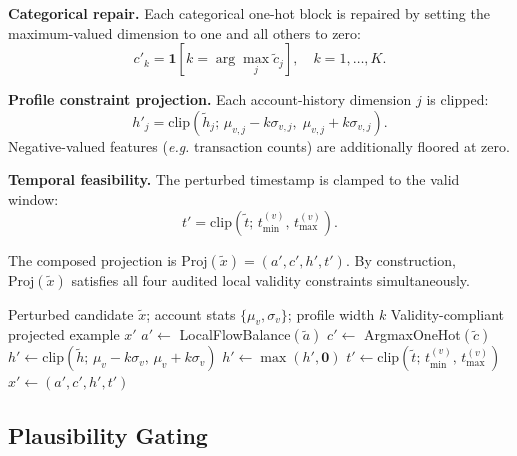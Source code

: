 \documentclass[sigconf,review,anonymous]{acmart}
\newcommand{\eg}{\textit{e.g.}\xspace}
\begin{document}
\textbf{Categorical repair.}
Each categorical one-hot block is repaired by setting the maximum-valued
dimension to one and all others to zero:
\begin{equation}
  c'_k = \mathbf{1}[k = \arg\max_j \tilde{c}_j], \quad k = 1, \ldots, K.
  \label{eq:cat}
\end{equation}

\textbf{Profile constraint projection.}
Each account-history dimension $j$ is clipped:
\begin{equation}
  h'_j = \mathrm{clip}\!\left(\tilde{h}_j;\,
    \mu_{v,j} - k\sigma_{v,j},\; \mu_{v,j} + k\sigma_{v,j}\right).
  \label{eq:profile}
\end{equation}
Negative-valued features (\eg transaction counts) are additionally floored
at zero.

\textbf{Temporal feasibility.}
The perturbed timestamp is clamped to the valid window:
\begin{equation}
  t' = \mathrm{clip}(\tilde{t};\, t_{\min}^{(v)},\, t_{\max}^{(v)}).
  \label{eq:temporal}
\end{equation}

The composed projection is $\text{Proj}(\tilde{x}) = (a', c', h', t')$.
By construction, $\text{Proj}(\tilde{x})$ satisfies all four audited local
validity constraints simultaneously.

\begin{algorithm}[t]
\caption{FeasibilityProject}
\label{alg:project}
\begin{algorithmic}[1]
\Require Perturbed candidate $\tilde{x}$; account stats $\{\mu_v, \sigma_v\}$;
         profile width $k$
\Ensure  Validity-compliant projected example $x'$
\State $a' \leftarrow$ LocalFlowBalance$(\tilde{a})$ 
\State $c' \leftarrow$ ArgmaxOneHot$(\tilde{c})$ 
\State $h' \leftarrow \mathrm{clip}(\tilde{h};\, \mu_v - k\sigma_v,\, \mu_v + k\sigma_v)$ 
\State $h' \leftarrow \max(h', \mathbf{0})$ 
\State $t' \leftarrow \mathrm{clip}(\tilde{t};\, t_{\min}^{(v)},\, t_{\max}^{(v)})$ 
\State \Return $x' \leftarrow (a', c', h', t')$
\end{algorithmic}
\end{algorithm}

\subsection{Plausibility Gating}
\label{subsec:plausibility}
\end{document}

